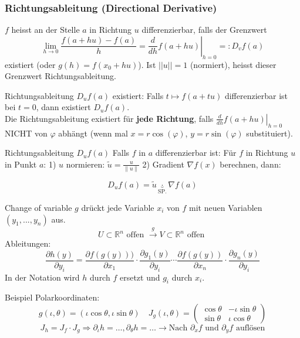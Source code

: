 \subsubsection{Richtungsableitung (Directional Derivative)}

$f$ heisst an der Stelle $a$ in Richtung $u$ differenzierbar, falls der Grenzwert 
	\[
		\lim_{h\to0}\frac{f(a + hu) -f(a)}{h} =
		\left.\frac{d}{dh}f(a+hu)\right|_{h = 0}
		=: D_vf(a)
	\]
existiert (oder $g(h) = f(x_0 + hu)$). Ist $||u|| = 1$ (normiert), heisst dieser Grenzwert Richtungsableitung.

\begin{Rezept}{Richtungsableitung $D_uf(a)$ existiert:}{} Falls $t \mapsto f(a + tu)$ differenzierbar ist bei $t=0$, dann existiert $D_uf(a)$.\\

	Die Richtungsableitung existiert für \textbf{jede Richtung}, falls $\left.\frac{d}{dh} f(a + hu) \right|_{h=0}$ NICHT von $\varphi$ abhängt (wenn mal $x=r\cos(\varphi)$, $y=r\sin(\varphi)$ substituiert).
\end{Rezept}

\begin{Rezept}{Richtungsableitung $D_u f(a)$}{}
Falls $f$ in $a$ differenzierbar ist: Für $f$ in Richtung $u$ in Punkt $a$: 1) $u$ normieren: $\tilde{u} = \frac{u}{\|u\|}$ 2) Gradient $\nabla f(x)$ berechnen, dann:

\[
    D_u f(a) = \tilde{u} \underbrace{\cdot}_{\text{SP.}} \nabla f(a)
\]
\end{Rezept}
\begin{Rezept}{Change of variable}{}
$g$ drückt jede Variable $x_i$ von $f$ mit neuen Variablen $(y_1, ..., y_n)$ aus.
\[
U \subset \mathbb{R}^n \text{ offen } \xrightarrow{g}  V \subset \mathbb{R}^n \text{ offen }
\]
Ableitungen:
\[
\frac{\partial h (y)}{\partial y_i} = \frac{\partial f(g(y)))}{\partial x_1} \cdot \frac{\partial g_1(y)}{\partial y_i} \cdots \frac{\partial f(g(y))}{\partial x_n} \cdot \frac{\partial g_n(y)}{\partial y_i}
\]
In der Notation wird $h$ durch $f$ ersetzt und $g_i$ durch $x_i$.
\end{Rezept}
Beispiel Polarkoordinaten:
\[
g(\iota, \theta) = (\iota \cos{\theta}, \iota \sin{\theta}) \quad
J_g(\iota, \theta) = \begin{pmatrix}
\cos{\theta} & -\iota \sin{\theta} \\ \sin{\theta} & \iota \cos{\theta}
\end{pmatrix}
\]
\[
J_h = J_f \cdot J_g \Rightarrow \partial_\iota h = \dots, \partial_\theta h = \dots \rightarrow \text{Nach $\partial_x f$ und $\partial_y f$ auflösen}
\]

